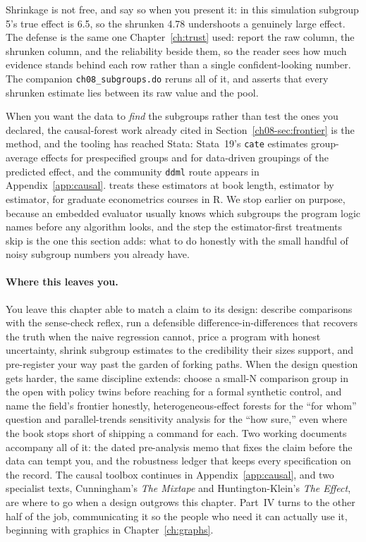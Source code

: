 Shrinkage is not free, and say so when you present it: in this simulation subgroup 5's true effect is 6.5, so the shrunken 4.78 undershoots a genuinely large effect. The defense is the same one Chapter~\ref{ch:trust} used: report the raw column, the shrunken column, and the reliability beside them, so the reader sees how much evidence stands behind each row rather than a single confident-looking number. The companion \texttt{ch08\_subgroups.do} reruns all of it, and asserts that every shrunken estimate lies between its raw value and the pool.

When you want the data to \emph{find} the subgroups rather than test the ones you declared, the causal-forest work already cited in Section~\ref{ch08-sec:frontier} is the method, and the tooling has reached Stata: Stata~19's \texttt{cate} estimates group-average effects for prespecified groups and for data-driven groupings of the predicted effect, and the community \texttt{ddml} route appears in Appendix~\ref{app:causal}. \textcite{huber2023causal} treats these estimators at book length, estimator by estimator, for graduate econometrics courses in R. We stop earlier on purpose, because an embedded evaluator usually knows which subgroups the program logic names before any algorithm looks, and the step the estimator-first treatments skip is the one this section adds: what to do honestly with the small handful of noisy subgroup numbers you already have.

\paragraph{Where this leaves you.} You leave this chapter able to match a claim to its design: describe comparisons with the sense-check reflex, run a defensible difference-in-differences that recovers the truth when the naive regression cannot, price a program with honest uncertainty, shrink subgroup estimates to the credibility their sizes support, and pre-register your way past the garden of forking paths. When the design question gets harder, the same discipline extends: choose a small-N comparison group in the open with policy twins before reaching for a formal synthetic control, and name the field's frontier honestly, heterogeneous-effect forests for the \enquote{for whom} question and parallel-trends sensitivity analysis for the \enquote{how sure,} even where the book stops short of shipping a command for each. Two working documents accompany all of it: the dated pre-analysis memo that fixes the claim before the data can tempt you, and the robustness ledger that keeps every specification on the record. The causal toolbox continues in Appendix~\ref{app:causal}, and two specialist texts, Cunningham's \emph{The Mixtape} and Huntington-Klein's \emph{The Effect}, are where to go when a design outgrows this chapter. Part~IV turns to the other half of the job, communicating it so the people who need it can actually use it, beginning with graphics in Chapter~\ref{ch:graphs}.

